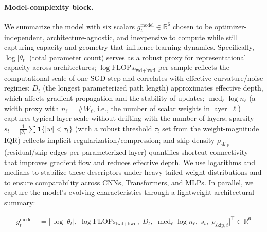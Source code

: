 \documentclass[11pt]{article}
\newcommand{\1}{\mathbf{1}}
\begin{document}
\paragraph{Model-complexity block.}
We summarize the model with six scalars $g^{\text{model}}_t\in\mathbb{R}^{6}$ chosen to be optimizer-independent, architecture-agnostic, and inexpensive to compute while still capturing capacity and geometry that influence learning dynamics. Specifically, $\log\lvert\theta_t\rvert$ (total parameter count) serves as a robust proxy for representational capacity across architectures; $\log\mathrm{FLOPs}_{\text{fwd+bwd}}$ per sample reflects the computational scale of one SGD step and correlates with effective curvature/noise regimes; $D_t$ (the longest parameterized path length) approximates effective depth, which affects gradient propagation and the stability of updates; $\operatorname{med}_\ell \log n_\ell$ (a width proxy with $n_\ell=\#W_\ell$, i.e., the number of scalar weights in layer~$\ell$) captures typical layer scale without drifting with the number of layers; sparsity $s_t=\frac{1}{\lvert\theta_t\rvert}\sum \mathbf{1}\{\lvert w\rvert<\tau_t\}$ (with a robust threshold $\tau_t$ set from the weight-magnitude $\mathrm{IQR})$ reflects implicit regularization/compression; and skip density $\rho_{\text{skip}}$ (residual/skip edges per parameterized layer) quantifies shortcut connectivity that improves gradient flow and reduces effective depth. We use logarithms and medians to stabilize these descriptors under heavy-tailed weight distributions and to ensure comparability across CNNs, Transformers, and MLPs. In parallel, we capture the model’s evolving characteristics through a lightweight architectural summary:

\begin{equation}
\label{eq:gmodel-full}
\begin{aligned}
g^{\text{model}}_t
&= \Big[\,
\log|\theta_t|,\;
\log \mathrm{FLOPs}_{\text{fwd+bwd}},\;
D_t,\;
\operatorname{med}_\ell \log n_\ell,\;
s_t,\;
\rho_{\text{skip},t}
\Big]^{\!\top}\!\in\mathbb{R}^{6}
\end{aligned}
\end{equation}
\end{document}
